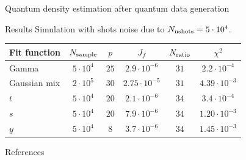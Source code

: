 \documentclass[20pt, final]{beamer}
\newlength{\sepwidth}
\newlength{\colwidth}
\newcommand{\separatorcolumn}{\begin{column}{\sepwidth}\end{column}}
\begin{document}
\begin{frame}[t]
\begin{columns}[t]
\begin{column}{\colwidth}
\begin{block}{Quantum density estimation after quantum data generation}
  \end{block}

  \begin{alertblock}{Results}
Simulation with shots noise due to $N_{\rm nshots}=5\cdot 10^4$.
\vspace{1cm}
  \begin{center}
  \begin{tabular}{lccccc}
  \hline \hline
    Fit function & $N_{\rm sample}$ & $p$ & $J_f$ & $N_{\rm ratio}$ & $\chi^2$\\
  \hline
    Gamma & $5 \cdot 10^4$ & $25$ & $2.9 \cdot 10^{-6}$ & $31$ & $2.2\cdot10^{-4}$ \\
    Gaussian mix & $2 \cdot 10^5$ & $30$ & $2.75 \cdot 10^{-5}$ & $31$ & $4.39 \cdot 10^{-3}$ \\
    $t$ & $5\cdot 10^4$ & $20$ & $2.1 \cdot 10^{-6}$ & $34$ & $3.4 \cdot 10^{-4}$ \\
    $s$ & $5\cdot 10^4$ & $20$ & $7.9 \cdot 10^{-6}$ & $34$ & $1.20 \cdot 10^{-3}$\\
    $y$ & $5\cdot 10^4$ & $8$ & $3.7 \cdot 10^{-6}$ & $34$ & $1.45 \cdot 10^{-3}$\\
  \hline \hline
  \end{tabular}
\end{center}

  \end{alertblock}

  \begin{block}{References}
  \nocite{*}
    \small  {}
  \end{block}

\end{column}

\separatorcolumn
\end{columns}
\end{frame}
\end{document}
